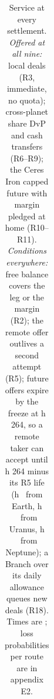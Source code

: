 \begin{table}[H]
\begin{tabularx}{\linewidth}{l>{\raggedleft\arraybackslash}p{0.9cm}>{\raggedleft\arraybackslash}p{0.9cm}>{\centering\arraybackslash}p{3.3cm}>{\centering\arraybackslash}p{1.8cm}X}
\bottomrule
\end{tabularx}
\caption{Service at every settlement. \emph{Offered at all nine:} local deals (R3, immediate, no quota); cross-planet
share DvP and cash transfers (R6--R9); the Ceres Iron capped future with margin pledged at home (R10--R11).
\emph{Conditions everywhere:} free balance covers the leg or the margin (R2); the remote offer outlives a second attempt (R5);
future offers expire by the freeze at h 264, so a remote taker can accept until h 264 minus its R5 life (h
\EtwoLatestEarth\ from Earth, h \EtwoLatestUranus\ from Uranus, h \EtwoLatestNeptune\ from Neptune); a Branch over its daily allowance queues new
deals (R18). Times are \conditional; loss probabilities per route are in appendix E2.}
\label{tab:service}
\end{table}
